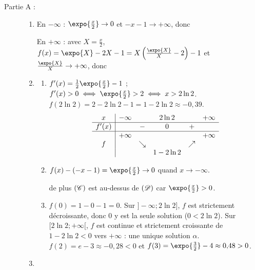 \begin{description}
	\item[Partie A :]
	\begin{enumerate}
		\item {}
			En $-\infty$ : $\expo{\frac{x}{2}} \to 0$ et $-x - 1 \to +\infty$, donc \par\noindent{}
			En $+\infty$ : avec $X = \frac{x}{2}$, $f(x) = \expo{X} - 2X - 1 = X\left(\frac{\expo{X}}{X} - 2\right) - 1$ et $\frac{\expo{X}}{X} \to +\infty$,
			donc \par\noindent{}
		\item
		\begin{enumerate}
			\item {}
				$f'(x) = \frac{1}{2}\expo{\frac{x}{2}} - 1$ ; $f'(x) > 0 \iff \expo{\frac{x}{2}} > 2 \iff x > 2\ln 2$.
				$f(2\ln 2) = 2 - 2\ln 2 - 1 = 1 - 2\ln 2 \approx -0{,}39$.
				\[
				\begin{array}{c|ccccc}
					x & -\infty & & 2\ln 2 & & +\infty \\ \hline
					f'(x) & & - & 0 & + & \\ \hline
					 & +\infty & & & & +\infty \\
					f & & \searrow & & \nearrow & \\
					 & & & 1 - 2\ln 2 & &
				\end{array}
				\]
			\item {}
				$f(x) - (-x - 1) = \expo{\frac{x}{2}} \to 0$ quand $x \to -\infty$.
				\par\noindent{}
				de plus $(\mathscr{C})$ est au-dessus de $(\mathscr{D})$ car $\expo{\frac{x}{2}} > 0$.
			\item {}
				$f(0) = 1 - 0 - 1 = 0$. Sur $]-\infty ; 2\ln 2]$, $f$ est strictement décroissante, donc $0$ y est la seule solution ($0 < 2\ln 2$).
				Sur $[2\ln 2 ; +\infty[$, $f$ est continue et strictement croissante de $1 - 2\ln 2 < 0$ vers $+\infty$ : une unique solution $\alpha$.
				$f(2) = e - 3 \approx -0{,}28 < 0$ et $f(3) = \expo{\frac{3}{2}} - 4 \approx 0{,}48 > 0$.
				\par\noindent{}
		\end{enumerate}
		\item {}

\end{enumerate}
\end{description}
